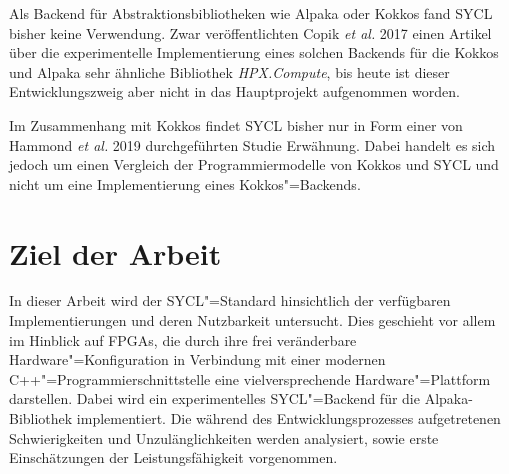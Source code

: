 Als Backend für Abstraktionsbibliotheken wie Alpaka oder Kokkos fand SYCL bisher
keine Verwendung. Zwar veröffentlichten Copik \textit{et al.} 2017 einen Artikel
über die experimentelle Implementierung eines solchen Backends für die Kokkos
und Alpaka sehr ähnliche Bibliothek \textit{HPX.Compute}, bis heute ist dieser
Entwicklungszweig aber nicht in das Hauptprojekt aufgenommen worden.
\cite[vgl.][]{copik2017}

Im Zusammenhang mit Kokkos findet SYCL bisher nur in Form einer von Hammond
\textit{et al.} 2019 durchgeführten Studie Erwähnung. Dabei handelt es sich
jedoch um einen Vergleich der Programmiermodelle von Kokkos und SYCL und nicht
um eine Implementierung eines Kokkos"=Backends.
\cite[vgl.][]{hammond2019}

\section{Ziel der Arbeit}\label{einleitung:ziel}

In dieser Arbeit wird der SYCL"=Standard hinsichtlich der verfügbaren
Implementierungen und deren Nutzbarkeit untersucht. Dies geschieht vor allem im
Hinblick auf FPGAs, die durch ihre frei veränderbare Hardware"=Konfiguration in
Verbindung mit einer modernen C++"=Programmierschnittstelle eine
vielversprechende Hardware"=Plattform darstellen. Dabei wird ein
experimentelles SYCL"=Backend für die Alpaka-Bibliothek implementiert. Die
während des Entwicklungsprozesses aufgetretenen Schwierigkeiten und
Unzulänglichkeiten werden analysiert, sowie erste Einschätzungen der
Leistungsfähigkeit vorgenommen.
